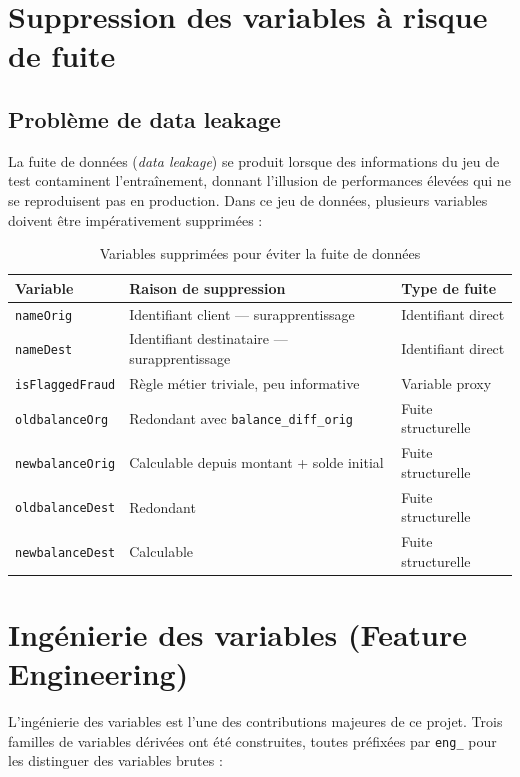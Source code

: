 \documentclass[12pt,a4paper,twoside]{report}
\theoremstyle{definition}
\begin{document}
\section{Suppression des variables à risque de fuite}

\subsection{Problème de data leakage}

La fuite de données (\textit{data leakage}) se produit lorsque des informations
du jeu de test contaminent l'entraînement, donnant l'illusion de performances
élevées qui ne se reproduisent pas en production. Dans ce jeu de données, plusieurs
variables doivent être impérativement supprimées :

\begin{table}[H]
\centering
\caption{Variables supprimées pour éviter la fuite de données}
\label{tab:dropped_cols}
\renewcommand{\arraystretch}{1.3}
\begin{tabular}{lll}
\toprule
\textbf{Variable} & \textbf{Raison de suppression} & \textbf{Type de fuite} \\
\midrule
\texttt{nameOrig}      & Identifiant client — surapprentissage & Identifiant direct \\
\texttt{nameDest}      & Identifiant destinataire — surapprentissage & Identifiant direct \\
\texttt{isFlaggedFraud} & Règle métier triviale, peu informative & Variable proxy \\
\texttt{oldbalanceOrg} & Redondant avec \texttt{balance\_diff\_orig} & Fuite structurelle \\
\texttt{newbalanceOrig} & Calculable depuis montant + solde initial & Fuite structurelle \\
\texttt{oldbalanceDest} & Redondant & Fuite structurelle \\
\texttt{newbalanceDest} & Calculable & Fuite structurelle \\
\bottomrule
\end{tabular}
\end{table}

\section{Ingénierie des variables (Feature Engineering)}

L'ingénierie des variables est l'une des contributions majeures de ce projet.
Trois familles de variables dérivées ont été construites, toutes préfixées par
\texttt{eng\_} pour les distinguer des variables brutes :
\end{document}
